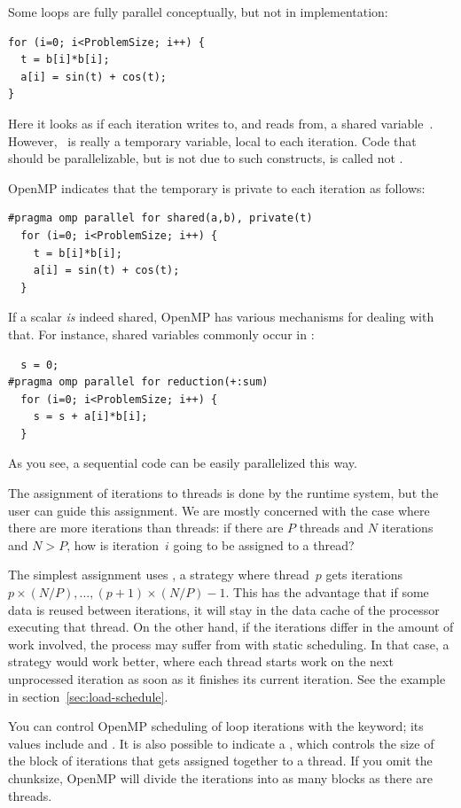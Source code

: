 Some loops are fully parallel conceptually, but not in implementation:
\begin{verbatim}
for (i=0; i<ProblemSize; i++) {
  t = b[i]*b[i];
  a[i] = sin(t) + cos(t);
}
\end{verbatim}
Here it looks as if each iteration writes to, and reads from, a shared
variable~. However, ~is really a temporary variable,
local to each iteration. Code that should be parallelizable, but is
not due to such constructs, is called not .

OpenMP indicates that the temporary is private to each iteration as follows:
\begin{verbatim}
#pragma omp parallel for shared(a,b), private(t)
  for (i=0; i<ProblemSize; i++) {
    t = b[i]*b[i];
    a[i] = sin(t) + cos(t);
  }
\end{verbatim}
If a scalar \emph{is} indeed shared, OpenMP has various mechanisms for
dealing with that. For instance, shared variables commonly occur in
:
\begin{verbatim}
  s = 0;
#pragma omp parallel for reduction(+:sum)
  for (i=0; i<ProblemSize; i++) {
    s = s + a[i]*b[i];
  }
\end{verbatim}
As you see, a sequential code can be easily parallelized this way.

The assignment of iterations to threads is done by the runtime system,
but the user can guide this assignment. We are mostly concerned with
the case where there are more iterations than threads: if there are
$P$ threads and $N$ iterations and $N>P$, how is iteration~$i$ going
to be assigned to a thread?

The simplest assignment uses , a
 strategy where thread~$p$ gets iterations
$p\times(N/P),\ldots,(p+1)\times (N/P)-1$.
This has the advantage that if some data is
reused between iterations, it will stay in the data cache of the
processor executing that thread. On the other hand, if the iterations
differ in the amount of work involved, the process may suffer from
 with static scheduling. In that case, a
 strategy would work better, where each
thread starts work on the next unprocessed iteration as soon as it
finishes its current iteration. See the example in section~\ref{sec:load-schedule}.

You can control OpenMP scheduling of loop iterations with the 
keyword; its values include  and . It is also possible 
to indicate a , which controls the size of the block of 
iterations that gets assigned together to a thread. If you omit the chunksize,
OpenMP will divide the iterations into as many blocks as there are threads.


